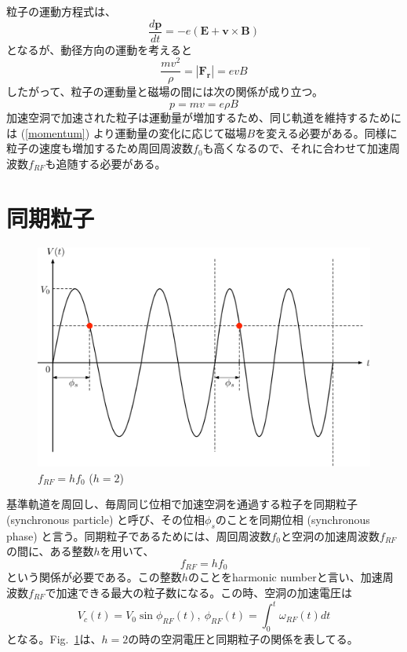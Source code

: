 \documentclass[10pt,a4paper]{ltjsarticle}
\begin{document}
粒子の運動方程式は、
%
\begin{equation}
  \frac{d\bm{p}}{dt} = -e (\bm{E} + \bm{v}\times \bm{B})
\end{equation}
%
となるが、動径方向の運動を考えると
%
\begin{equation}
  \frac{m v^2}{\rho} = |\bm{F_r}| = e v B
\end{equation}
%
したがって、粒子の運動量と磁場の間には次の関係が成り立つ。
%
\begin{equation}
  p = mv = e \rho B
  \label{momentum}
\end{equation}
%
加速空洞で加速された粒子は運動量が増加するため、同じ軌道を維持するためには (\ref{momentum}) より運動量の変化に応じて磁場$B$を変える必要がある。同様に粒子の速度も増加するため周回周波数$f_0$も高くなるので、それに合わせて加速周波数$f_{RF}$も追随する必要がある。
%
\section{同期粒子}
\begin{figure}[hbt]
  \begin{center}
    \includegraphics[width=15cm,clip]{synchronous.pdf}
    \caption{$f_{RF} = h f_0$ ($h=2$)}
    \label{synchronous}
  \end{center}
\end{figure}

基準軌道を周回し、毎周同じ位相で加速空洞を通過する粒子を同期粒子 (synchronous particle) と呼び、その位相$\phi_s$のことを同期位相 (synchronous phase) と言う。同期粒子であるためには、周回周波数$f_0$と空洞の加速周波数$f_{RF}$の間に、ある整数$h$を用いて、
%
\begin{equation}
    f_{RF} = h f_0
    \label{harmonic}
\end{equation}
%
という関係が必要である。この整数$h$のことをharmonic numberと言い、加速周波数$f_{RF}$で加速できる最大の粒子数になる。この時、空洞の加速電圧は
%
\begin{equation}
    V_c (t) = V_0 \sin \phi_{RF}(t),\:\phi_{RF}(t) = \int_0^t \omega_{RF}(t) dt
\end{equation}
%
となる。Fig.~\ref{synchronous}は、$h=2$の時の空洞電圧と同期粒子の関係を表してる。
\end{document}

